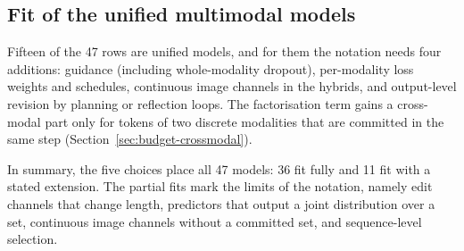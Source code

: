 \subsection{Fit of the unified multimodal models}
\label{sec:design-unified}

Fifteen of the 47 rows are unified models, and for them the notation needs four additions: guidance (including whole-modality dropout), per-modality loss weights and schedules, continuous image channels in the hybrids, and output-level revision by planning or reflection loops. The factorisation term gains a cross-modal part only for tokens of two discrete modalities that are committed in the same step (Section~\ref{sec:budget-crossmodal}). %

In summary, the five choices place all 47 models: 36 fit fully and 11 fit with a stated extension. The partial fits mark the limits of the notation, namely edit channels that change length, predictors that output a joint distribution over a set, continuous image channels without a committed set, and sequence-level selection.
